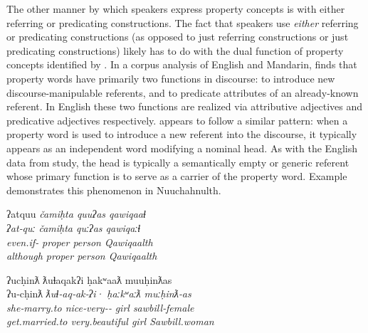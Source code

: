 The other manner by which speakers express property concepts is with either referring or predicating constructions. The fact that speakers use \emph{either} referring or predicating constructions (as opposed to just referring constructions or just predicating constructions) likely has to do with the dual function of property concepts identified by \textcite{Thompson1989}. In a corpus analysis of English and Mandarin, \citeauthor{Thompson1989} finds that property words have primarily two functions in discourse: to introduce new discourse-manipulable referents, and to predicate attributes of an already-known referent. In English these two functions are realized via attributive adjectives and predicative adjectives respectively.  appears to follow a similar pattern: when a property word is used to introduce a new referent into the discourse, it typically appears as an independent word modifying a nominal head. As with the English data from  study, the head is typically a semantically empty or generic referent whose primary function is to serve as a carrier of the property word. Example  demonstrates this phenomenon in Nuuchahnulth.

\begin{exe}
  \ex\label{ex:4.2}
  \begin{xlist}

    \ex\label{ex:4.2a}
    \gllll ʔatquu              \em{čamiḥta} quuʔas qawiqaaɬ\\
           ʔat‑quː             \em{čamiḥta} quːʔas qawiqaːɬ\\
           even.if‑ \em{proper}  person Qawiqaalth\\
           although            \em{proper}  person Qawiqaalth\\

    \ex\label{ex:4.2b}
    \gllll ʔucḥinƛ        ƛuɬaqakʔi                      ḥakʷaaƛ  muuḥinƛas\\
           ʔu‑cḥinƛ       \em{ƛuɬ}‑aq‑ak‑ʔi·               ḥaːkʷaːƛ muːḥinƛ‑as\\
           she‑marry.to   \em{nice}‑very‑‑ girl     sawbill‑female\\
           get.married.to very.beautiful                 girl     Sawbill.woman\\

  \end{xlist}
\end{exe}

